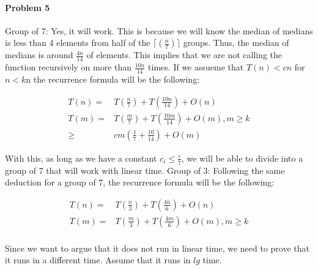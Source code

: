 \documentclass[11pt]{article}
\begin{document}
\paragraph{\noindent\textbf{\LARGE{Problem 5}}}

\begin{flushleft}
    Group of 7:
    \newline
    \newline
    Yes, it will work. This is because we will know the median of medians is less than 4 elements
    from half of the ${\lceil}(\frac{n}{7}){\rceil}$ groups. Thus,
    the median of medians is around $\frac{4n}{14}$ of elements. This implies that we are not calling the function
    recursively on more than $\frac{10n}{14}$ times.
    \newline
    \newline
    If we assueme that $T(n) <cn$ for $n < k$n the recurrence formula will be the following:
\end{flushleft}    
\begin{equation*}
\begin {split}
    T(n) =& T(\frac{n}{7}) + T(\frac{10n}{14}) + O(n) \\
    T(m) =& T(\frac{m}{7}) + T(\frac{10m}{14}) + O(m), m \geq k \\ 
            \geq & cm(\frac{1}{7} + \frac{10}{14}) + O(m) 
\end {split}
\end{equation*}
\begin{flushleft}
    With this, as long as we have a constant $c_i \leq \frac{c}{7}$, we will be able to divide into a group of 7 that will work with linear time.
    \newline
    \newline
    Group of 3:
    \newline
    \newline
    Following the same deduction for a group of 7, the recurrence formula will be the following:
\end{flushleft}  
\begin{equation*}
\begin {split}
    T(n) =& T(\frac{n}{3}) + T(\frac{4n}{6}) + O(n) \\
    T(m) =& T(\frac{m}{3}) + T(\frac{4m}{6}) + O(m), m \geq k \\ 
\end {split}
\end{equation*}
\begin{flushleft}
    Since we want to argue that it does not run in linear time, we need to prove that it runs in a different time.
    Assume that it runs in $lg$ time.
\end{flushleft} 
\end{document}
